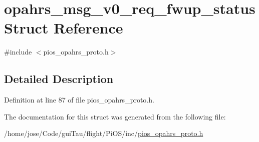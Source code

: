 \hypertarget{structopahrs__msg__v0__req__fwup__status}{\section{opahrs\-\_\-msg\-\_\-v0\-\_\-req\-\_\-fwup\-\_\-status Struct Reference}
\label{structopahrs__msg__v0__req__fwup__status}
}


{\ttfamily \#include $<$pios\-\_\-opahrs\-\_\-proto.\-h$>$}



\subsection{Detailed Description}


Definition at line 87 of file pios\-\_\-opahrs\-\_\-proto.\-h.



The documentation for this struct was generated from the following file\-:\begin{DoxyCompactItemize}
\item 
/home/jose/\-Code/gui\-Tau/flight/\-Pi\-O\-S/inc/\hyperlink{pios__opahrs__proto_8h}{pios\-\_\-opahrs\-\_\-proto.\-h}\end{DoxyCompactItemize}
